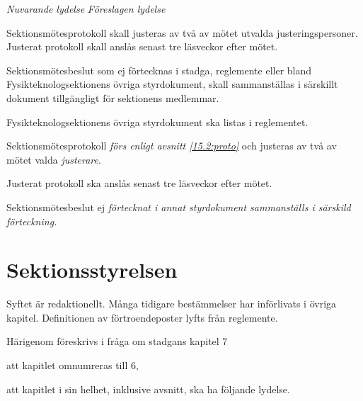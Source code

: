 \documentclass{article}
\newenvironment{lydelse}
    {\begin{paracol}{2}%
        \emph{Nuvarande lydelse}%
        \switchcolumn%
        \emph{Föreslagen lydelse}%
    \end{paracol}%
    \begin{enumerate}[label=\thesubsection.\arabic*]%
    \begin{paracol}{2}%
    }{\end{paracol}\end{enumerate}}
\begin{document}
\begin{lydelse}
  \setcounter{subsection}{14}
  \item Sektionsmötesprotokoll skall justeras av två av mötet utvalda
  justeringspersoner. Justerat protokoll skall anslås senast tre
  läsveckor efter mötet.

  \setcounter{subsection}{15}
  \setcounter{enumi}{0}
  \item Sektionsmötesbeslut som ej förtecknas i stadga, reglemente eller bland Fysikteknologsektionens övriga styrdokument, skall sammanställas i särskillt dokument tillgängligt för sektionens medlemmar.

  \item Fysikteknologsektionens övriga styrdokument ska listas i reglementet.
  
  \switchcolumn
  \setcounter{subsection}{5}
  \setcounter{enumi}{0}

  \item Sektionsmötesprotokoll \emph{förs enligt avsnitt \ref{15.2:proto}} och justeras av två av mötet valda \emph{justerare}.

  \item Justerat protokoll ska anslås senast tre läsveckor efter mötet.

  \item Sektionsmötesbeslut ej \emph{förtecknat i annat styrdokument sammanställs i särskild förteckning.}
\end{lydelse}

\section{Sektionsstyrelsen}
Syftet är redaktionellt.
Många tidigare bestämmelser har införlivats i övriga kapitel.
Definitionen av förtroendeposter lyfts från reglemente.

Härigenom föreskrivs i fråga om stadgans kapitel 7
\begin{dels}
  \item att kapitlet omnumreras till 6,
  \item att kapitlet i sin helhet, inklusive avsnitt, ska ha följande lydelse.
\end{dels}
\end{document}

